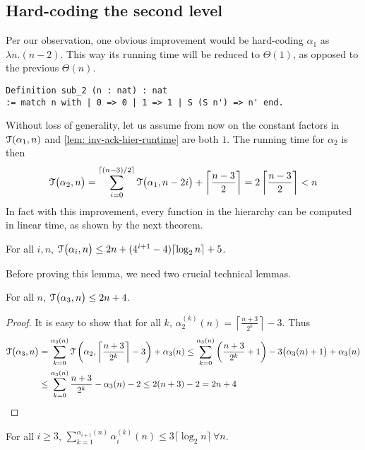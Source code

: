 \subsection{Hard-coding the second level}
Per our observation, one obvious improvement would be hard-coding $\alpha_1$ as $\lambda n.(n-2)$. This way its running time will be reduced to $\Theta(1)$, as opposed to the previous $\Theta(n)$.
\begin{lstlisting}
Definition sub_2 (n : nat) : nat
:= match n with | 0 => 0 | 1 => 1 | S (S n') => n' end.
\end{lstlisting}
Without loss of generality, let us assume from now on the constant factors in $\mathcal{T}(\alpha_1, n)$ and \cref{lem: inv-ack-hier-runtime} are both $1$. The running time for $\alpha_2$ is then
\begin{equation*}
\mathcal{T}\big(\alpha_2, n\big)
 = \sum_{i=0}^{\lceil (n-3)/2 \rceil} \mathcal{T} \big(\alpha_1, n-2i\big) + \left\lceil \frac{n-3}{2} \right\rceil =  2\left\lceil \frac{n-3}{2} \right\rceil
 < n 
\end{equation*}
In fact with this improvement, every function in the hierarchy can be computed in linear time, as shown by the next theorem.
\begin{thm} \label{thm: inv-ack-hier-runtime-improved}
	For all $i, n$, $\mathcal{T}\big(\alpha_i, n\big) \le 2n + (4^{i+1} - 4)\lceil \log_2n\rceil + 5$.
\end{thm}
Before proving this lemma, we need two crucial technical lemmas.
\begin{lem} \label{lem: inv-ack-3-runtime}
	For all $n$, $\mathcal{T}\big(\alpha_3, n\big) \le 2n + 4$.
\end{lem}
\begin{proof}
	It is easy to show that for all $k$, $\alpha_2^{(k)}(n) = \left\lceil \frac{n+3}{2^k} \right\rceil - 3$. Thus
	\begin{equation*}
	\begin{aligned}
	\mathcal{T}\big(\alpha_3, n\big) & =
	\sum_{k=0}^{\alpha_{3}(n)}\mathcal{T}\left(\alpha_2, \left\lceil \frac{n+3}{2^k} \right\rceil - 3\right) + \alpha_{3}(n)  \le \sum_{k=0}^{\alpha_3(n)}\left(\frac{n+3}{2^k} + 1\right) - 3\big(\alpha_3(n) + 1\big) + \alpha_3(n) \\
	& \le \sum_{k=0}^{\alpha_3(n)}\frac{n+3}{2^k} - \alpha_3(n) - 2 \le 2(n+3) - 2 = 2n + 4
	\end{aligned}
	\end{equation*}
\end{proof}
\begin{lem}
	For all $i\ge 3$, $\displaystyle \sum_{k=1}^{\alpha_{i+1}(n)} \alpha_i^{(k)}(n) \le 3\big\lceil \log_2n \big\rceil \ \forall n$.
\end{lem}
